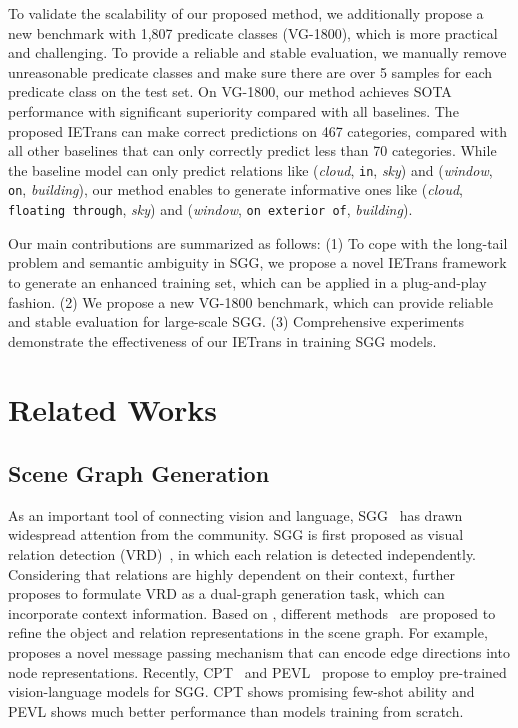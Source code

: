 \documentclass[runningheads]{llncs}
\begin{document}
To validate the scalability of our proposed method, we additionally propose a new benchmark with 1,807 predicate classes (VG-1800), which is more practical and challenging. 
To provide a reliable and stable evaluation, we manually remove unreasonable predicate classes and make sure there are over 5 samples for each predicate class on the test set.
On VG-1800, our method achieves SOTA performance with significant superiority compared with all baselines.
The proposed IETrans can make correct predictions on 467 categories, compared with all other baselines that can only correctly predict less than 70 categories.
While the baseline model can only predict relations like (\textit{cloud}, \texttt{in}, \textit{sky}) and (\textit{window}, \texttt{on}, \textit{building}), our method enables to generate informative ones like (\textit{cloud}, \texttt{floating through}, \textit{sky}) and (\textit{window}, \texttt{on exterior of}, \textit{building}). 


Our main contributions are summarized as follows: (1) To cope with the long-tail problem and semantic ambiguity in SGG, we propose a novel IETrans framework to generate an enhanced training set, which can be applied in a plug-and-play fashion.
(2) We propose a new VG-1800 benchmark, which can provide reliable and stable evaluation for large-scale SGG.
(3) Comprehensive experiments demonstrate the effectiveness of our IETrans in training SGG models.


\section{Related Works}
\subsection{Scene Graph Generation}
As an important tool of connecting vision and language, SGG~\cite{xu2017scene,lu2016visual,li2021interventional} has drawn widespread attention from the community. SGG is first proposed as visual relation detection (VRD)~\cite{lu2016visual}, in which each relation is detected independently. Considering that relations are highly dependent on their context, \cite{xu2017scene} further proposes to formulate VRD as a dual-graph generation task, which can incorporate context information.
Based on \cite{xu2017scene}, different methods~\cite{lin2020gps,tang2019learning,zellers2018motif} are proposed to refine the object and relation representations in the scene graph.
For example, \cite{lin2020gps} proposes a novel message passing mechanism that can encode edge directions into node representations. 
Recently, CPT~\cite{yao2021cpt} and PEVL~\cite{yao2022pevl} propose to employ pre-trained vision-language models for SGG.
CPT shows promising few-shot ability and PEVL shows much better performance than models training from scratch.
\end{document}
